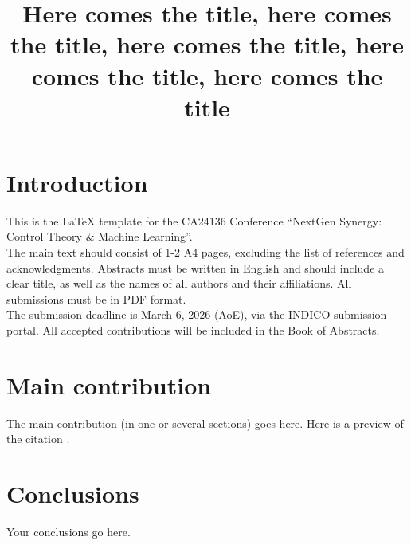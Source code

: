 

\thispagestyle{fancy}

\title{Here comes the title, here comes the title, here comes the title, here comes the title, here comes the title}





\section{Introduction}
This is the LaTeX template for the CA24136 Conference ``NextGen Synergy: Control Theory \& Machine Learning''. \\
The main text should consist of 1-2 A4 pages, excluding the list of references and acknowledgments. Abstracts must be written in English and should include a clear title, as well as the names of all authors and their affiliations. All submissions must be in PDF format. \\
The submission deadline is March 6, 2026 (AoE), via the INDICO submission portal. All accepted contributions will be included in the Book of Abstracts.

\section{Main contribution}
The main contribution (in one or several sections) goes here. Here is a preview of the citation \cite{articleID}.

\section{Conclusions}
Your conclusions go here.



 